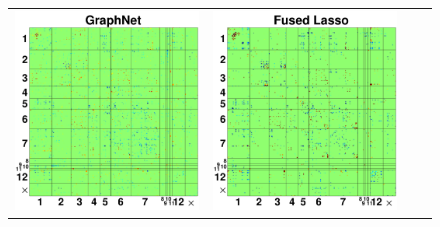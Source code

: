 \begin{figure}[t!]
\begin{minipage}{\textwidth}
\begin{tabular}{cccc}
	\includegraphics[width=\imwidth]{exp_median_wmat_gnet.pdf} &
	\includegraphics[width=\imwidth]{exp_median_wmat_flas.pdf} &

\end{tabular}
\end{minipage}
\end{figure}

